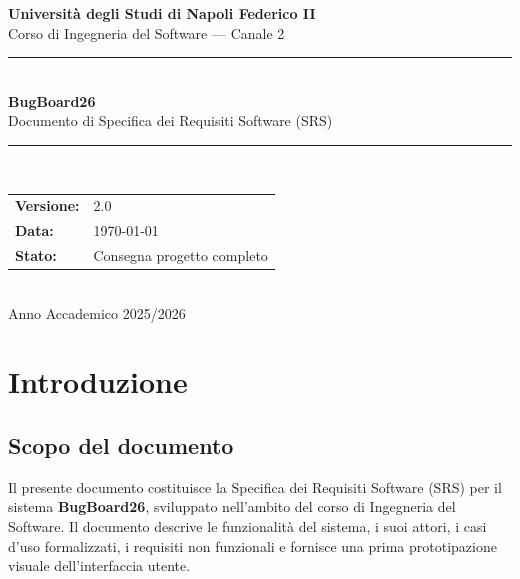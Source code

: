 \documentclass[12pt,a4paper]{article}
\begin{document}

\begin{titlepage}
    \centering
    \vspace*{2cm}
    {\LARGE \textbf{Università degli Studi di Napoli Federico II}} \\[0.5cm]
    {\large Corso di Ingegneria del Software --- Canale 2} \\[3cm]

    \rule{\linewidth}{0.5mm} \\[0.4cm]
    {\Huge \textbf{BugBoard26}} \\[0.2cm]
    {\Large Documento di Specifica dei Requisiti Software (SRS)} \\
    \rule{\linewidth}{0.5mm} \\[2cm]

    {\large
    \begin{tabular}{ll}
        \textbf{Versione:} & 2.0 \\[0.3cm]
        \textbf{Data:}     & \today \\[0.3cm]
        \textbf{Stato:}    & Consegna progetto completo \\
    \end{tabular}
    } \\[3cm]

    \vfill
    {\large Anno Accademico 2025/2026}
\end{titlepage}

\tableofcontents
\newpage

\section{Introduzione}

\subsection{Scopo del documento}
Il presente documento costituisce la Specifica dei Requisiti Software (SRS) per il sistema \textbf{BugBoard26}, sviluppato nell'ambito del corso di Ingegneria del Software. Il documento descrive le funzionalità del sistema, i suoi attori, i casi d'uso formalizzati, i requisiti non funzionali e fornisce una prima prototipazione visuale dell'interfaccia utente.
\end{document}
